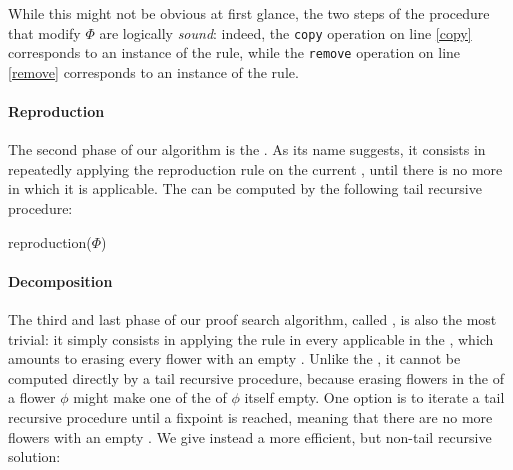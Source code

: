 \begin{scope}
While this might not be obvious at first glance, the two steps of the
 procedure that modify $\Phi$ are logically
\emph{sound}: indeed, the \texttt{copy} operation on line \ref{copy} corresponds
to an instance of the  rule, while the \texttt{remove} operation
on line \ref{remove} corresponds to an instance of the  rule.

\paragraph{Reproduction}

The second phase of our algorithm is the . As its name
suggests, it consists in repeatedly applying the reproduction rule  on
the current , until there is no more  in which it is
applicable. The  can be computed
by the following tail recursive procedure:

\begin{procedure}[H]
  \caption{reproduction($\Phi$)}
  \BlankLine

\end{procedure}

\paragraph{Decomposition}

The third and last phase of our proof search algorithm, called
, is also the most trivial: it simply consists in applying
the  rule in every applicable  in the , which amounts to
erasing every flower with an empty . Unlike the , it cannot be
computed directly by a tail recursive procedure, because erasing flowers in the
 of a flower $\phi$ might make one of the  of $\phi$ itself empty.
One option is to iterate a tail recursive procedure until a fixpoint is reached,
meaning that there are no more flowers with an empty . We give instead a
more efficient, but non-tail recursive solution:


\end{scope}
